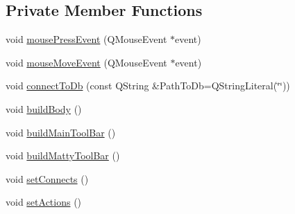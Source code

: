 \subsection*{Private Member Functions}
\begin{DoxyCompactItemize}
\item 
void \hyperlink{class_matty_notes_main_window_af6fed8f1ef3716a2b3074fd7f78ee23a}{mouse\+Press\+Event} (Q\+Mouse\+Event $\ast$event)
\item 
void \hyperlink{class_matty_notes_main_window_a83425b00e2b3bdbe213535894b11cc3a}{mouse\+Move\+Event} (Q\+Mouse\+Event $\ast$event)
\item 
void \hyperlink{class_matty_notes_main_window_acd6f123f89d4e5f1d240cbd54e92d1fc}{connect\+To\+Db} (const Q\+String \&Path\+To\+Db=Q\+String\+Literal(\char`\"{}\char`\"{}))
\item 
void \hyperlink{class_matty_notes_main_window_af75387f6dfa1be40552c54a91795d196}{build\+Body} ()
\item 
void \hyperlink{class_matty_notes_main_window_a060784fda6abdec934d9c37843e8d05a}{build\+Main\+Tool\+Bar} ()
\item 
void \hyperlink{class_matty_notes_main_window_a1ded942c8dec7b0443eef1c51a425af4}{build\+Matty\+Tool\+Bar} ()
\item 
void \hyperlink{class_matty_notes_main_window_a1736856c4d60ba43f973d5bd627f0ec0}{set\+Connects} ()
\item 
void \hyperlink{class_matty_notes_main_window_a1f827486a3eaaf0ce59f8ea4bc70ab87}{set\+Actions} ()
\end{DoxyCompactItemize}
